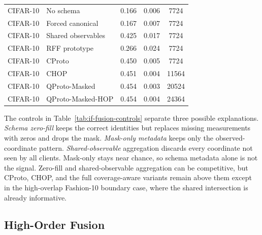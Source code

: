 \documentclass[preprint]{elsarticle}
\begin{document}
\begin{table}[t]
\begin{tabular}{llccc}
CIFAR-10 & No schema & 0.166 & 0.006 & 7724 \\
CIFAR-10 & Forced canonical & 0.167 & 0.007 & 7724 \\
CIFAR-10 & Shared observables & 0.425 & 0.017 & 7724 \\
CIFAR-10 & RFF prototype & 0.266 & 0.024 & 7724 \\
CIFAR-10 & CProto & 0.450 & 0.005 & 7724 \\
CIFAR-10 & CHOP & 0.451 & 0.004 & 11564 \\
CIFAR-10 & QProto-Masked & 0.454 & 0.003 & 20524 \\
CIFAR-10 & QProto-Masked-HOP & 0.454 & 0.004 & 24364 \\
\bottomrule
\end{tabular}
\end{table}


The controls in Table~\ref{tab:if-fusion-controls} separate three possible explanations. \emph{Schema zero-fill} keeps the correct identities but replaces missing measurements with zeros and drops the mask. \emph{Mask-only metadata} keeps only the observed-coordinate pattern. \emph{Shared-observable} aggregation discards every coordinate not seen by all clients. Mask-only stays near chance, so schema metadata alone is not the signal. Zero-fill and shared-observable aggregation can be competitive, but CProto, CHOP, and the full coverage-aware variants remain above them except in the high-overlap Fashion-10 boundary case, where the shared intersection is already informative.

\subsection{High-Order Fusion}
\end{document}
